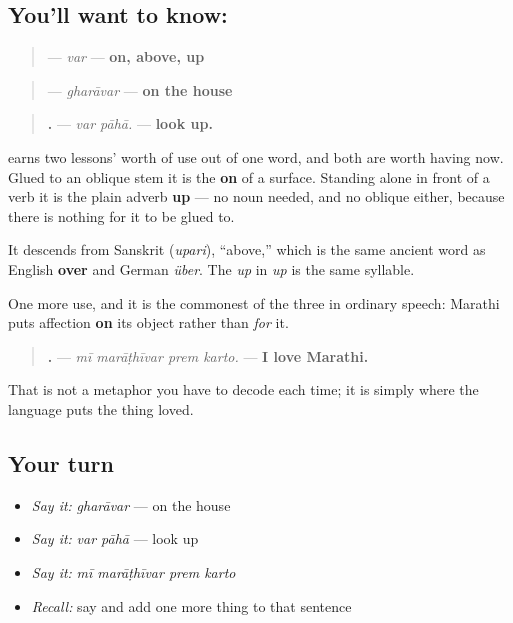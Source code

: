 \subsection*{You'll want to know: }
\begin{quote}
\textbf{} — \emph{var} — \textbf{on, above, up}
\end{quote}

\begin{quote}
\textbf{} — \emph{gharāvar} — \textbf{on the house}
\end{quote}

\begin{quote}
\textbf{ .} — \emph{var pāhā.} — \textbf{look up.}
\end{quote}

\textbf{} earns two lessons' worth of use out of one word, and both are worth having now. Glued to an oblique stem it is the \textbf{on} of a surface. Standing alone in front of a verb it is the plain adverb \textbf{up} — no noun needed, and no oblique either, because there is nothing for it to be glued to.

It descends from Sanskrit \textbf{} (\emph{upari}), \textquotedblleft{}above,\textquotedblright{} which is the same ancient word as English \textbf{over} and German \emph{über}. The \emph{up} in \emph{up} is the same syllable.

One more use, and it is the commonest of the three in ordinary speech: Marathi puts affection \textbf{on} its object rather than \emph{for} it.

\begin{quote}
\textbf{   .} — \emph{mī marāṭhīvar prem karto.} — \textbf{I love Marathi.}
\end{quote}

That is not a metaphor you have to decode each time; it is simply where the language puts the thing loved.

\subsection*{Your turn}
\begin{itemize}
\raggedright
  \item \emph{Say it:} \emph{gharāvar} — on the house
  \item \emph{Say it:} \emph{var pāhā} — look up
  \item \emph{Say it:} \emph{mī marāṭhīvar prem karto}
  \item \emph{Recall:} say \textbf{} and add one more thing to that sentence
\end{itemize}

